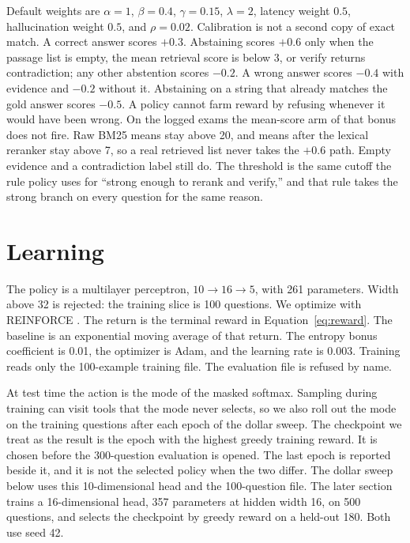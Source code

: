\documentclass[letterpaper]{article} %
\begin{document}
Default weights are \(\alpha{=}1\), \(\beta{=}0.4\), \(\gamma{=}0.15\), \(\lambda{=}2\), latency weight \(0.5\), hallucination weight \(0.5\), and \(\rho{=}0.02\). Calibration is not a second copy of exact match. A correct answer scores \(+0.3\). Abstaining scores \(+0.6\) only when the passage list is empty, the mean retrieval score is below 3, or verify returns contradiction; any other abstention scores \(-0.2\). A wrong answer scores \(-0.4\) with evidence and \(-0.2\) without it. Abstaining on a string that already matches the gold answer scores \(-0.5\). A policy cannot farm reward by refusing whenever it would have been wrong. On the logged exams the mean-score arm of that bonus does not fire. Raw BM25 means stay above 20, and means after the lexical reranker stay above 7, so a real retrieved list never takes the \(+0.6\) path. Empty evidence and a contradiction label still do. The threshold is the same cutoff the rule policy uses for ``strong enough to rerank and verify,'' and that rule takes the strong branch on every question for the same reason.

\section{Learning}
The policy is a multilayer perceptron, \(10 \rightarrow 16 \rightarrow 5\), with 261 parameters. Width above 32 is rejected: the training slice is 100 questions. We optimize with REINFORCE \cite{williams1992reinforce}. The return is the terminal reward in Equation~\ref{eq:reward}. The baseline is an exponential moving average of that return. The entropy bonus coefficient is 0.01, the optimizer is Adam, and the learning rate is 0.003. Training reads only the 100-example training file. The evaluation file is refused by name.

At test time the action is the mode of the masked softmax. Sampling during training can visit tools that the mode never selects, so we also roll out the mode on the training questions after each epoch of the dollar sweep. The checkpoint we treat as the result is the epoch with the highest greedy training reward. It is chosen before the 300-question evaluation is opened. The last epoch is reported beside it, and it is not the selected policy when the two differ. The dollar sweep below uses this 10-dimensional head and the 100-question file. The later section trains a 16-dimensional head, 357 parameters at hidden width 16, on 500 questions, and selects the checkpoint by greedy reward on a held-out 180. Both use seed 42.
\end{document}
